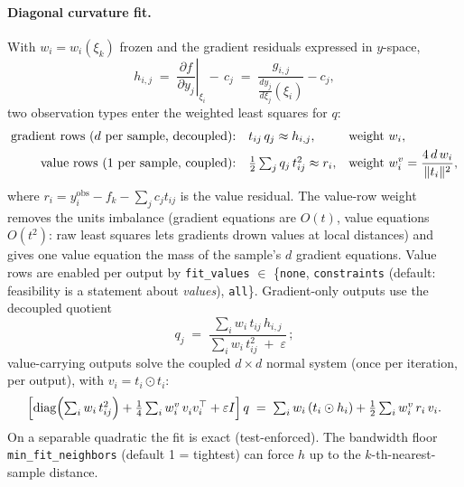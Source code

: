 \documentclass[11pt,a4paper]{article}
\newcommand{\code}[1]{\texttt{#1}}
\newcommand{\xxi}{\xi}
\DeclareMathOperator{\diag}{diag}
\begin{document}
\paragraph{Diagonal curvature fit.} With $w_i = w_i(\xxi_k)$ frozen and the
gradient residuals expressed in $y$-space,
\begin{equation}
h_{i,j} \;=\; \left.\frac{\partial f}{\partial y_j}\right|_{\xxi_i} - \,c_j
\;=\; \frac{g_{i,j}}{\tfrac{dy_j}{d\xxi_j}(\xxi_i)} - c_j ,
\end{equation}
two observation types enter the weighted least squares for $q$:
\begin{align}
\text{gradient rows ($d$ per sample, decoupled):}&\quad
t_{ij}\, q_j \approx h_{i,j}, &&\text{weight } w_i, \notag\\
\text{value rows (1 per sample, coupled):}&\quad
\tfrac12 \textstyle\sum_j q_j\, t_{ij}^2 \approx r_i, &&\text{weight }
w^v_i = \dfrac{4\,d\, w_i}{\lVert t_i \rVert^2}, \notag
\end{align}
where $r_i = y^{\mathrm{obs}}_i - f_k - \sum_j c_j t_{ij}$ is the value
residual. The value-row weight removes the units imbalance (gradient
equations are $O(t)$, value equations $O(t^2)$: raw least squares lets
gradients drown values at local distances) and gives one value equation the
mass of the sample's $d$ gradient equations. Value rows are enabled per
output by \code{fit\_values} $\in$ \{\code{none}, \code{constraints}
(default: feasibility is a statement about \emph{values}), \code{all}\}.
Gradient-only outputs use the decoupled quotient
\begin{equation}
q_j \;=\; \frac{\sum_i w_i\, t_{ij}\, h_{i,j}}
{\sum_i w_i\, t_{ij}^2 \;+\; \varepsilon}\,;
\label{eq:secant}
\end{equation}
value-carrying outputs solve the coupled $d\times d$ normal system (once per
iteration, per output), with $v_i = t_i \odot t_i$:
\begin{equation}
\Bigl[\diag\Bigl(\textstyle\sum_i w_i\, t_{ij}^2\Bigr)
+ \tfrac14 \textstyle\sum_i w^v_i\, v_i^{\vphantom{\top}} v_i^{\top}
+ \varepsilon I\Bigr]\, q
\;=\;
\textstyle\sum_i w_i\, (t_i \odot h_i)
+ \tfrac12 \textstyle\sum_i w^v_i\, r_i\, v_i .
\label{eq:coupled}
\end{equation}
On a separable quadratic the fit is exact (test-enforced). The bandwidth
floor \code{min\_fit\_neighbors} (default 1 = tightest) can force $h$ up to
the $k$-th-nearest-sample distance.
\end{document}
